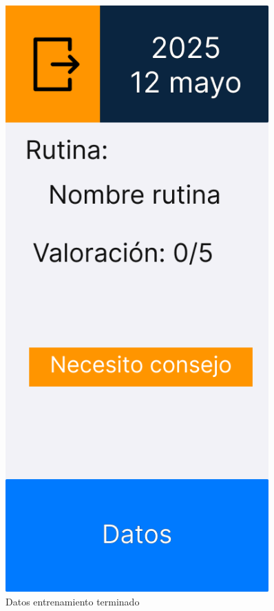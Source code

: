 \begin{figure}[H]
\begin{minipage}{0.45\textwidth}
      \label{fig:Metas cumplidas}
   \end{minipage}%
   \hspace{0.5cm}
   \begin{minipage}{0.45\textwidth}
      \centering
      \includegraphics[width=0.9\textwidth]{fotos/Frame 31.png}
      \caption{Datos entrenamiento terminado}
      \label{fig:Datos entrenamiento terminado}
   \end{minipage}
\end{figure}

